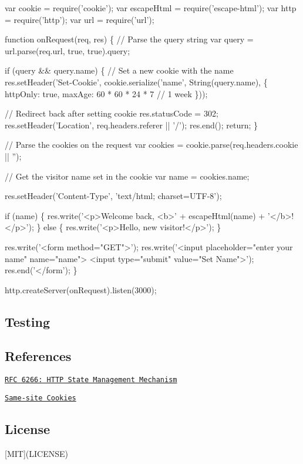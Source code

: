 \begin{DoxyCode}
var cookie = require('cookie');
var escapeHtml = require('escape-html');
var http = require('http');
var url = require('url');

function onRequest(req, res) \{
  // Parse the query string
  var query = url.parse(req.url, true, true).query;

  if (query && query.name) \{
    // Set a new cookie with the name
    res.setHeader('Set-Cookie', cookie.serialize('name', String(query.name), \{
      httpOnly: true,
      maxAge: 60 * 60 * 24 * 7 // 1 week
    \}));

    // Redirect back after setting cookie
    res.statusCode = 302;
    res.setHeader('Location', req.headers.referer || '/');
    res.end();
    return;
  \}

  // Parse the cookies on the request
  var cookies = cookie.parse(req.headers.cookie || '');

  // Get the visitor name set in the cookie
  var name = cookies.name;

  res.setHeader('Content-Type', 'text/html; charset=UTF-8');

  if (name) \{
    res.write('<p>Welcome back, <b>' + escapeHtml(name) + '</b>!</p>');
  \} else \{
    res.write('<p>Hello, new visitor!</p>');
  \}

  res.write('<form method="GET">');
  res.write('<input placeholder="enter your name" name="name"> <input type="submit" value="Set Name">');
  res.end('</form');
\}

http.createServer(onRequest).listen(3000);
\end{DoxyCode}


\subsection*{Testing}




\subsection*{References}


\begin{DoxyItemize}
\item \href{https://tools.ietf.org/html/rfc6266}{\tt R\+FC 6266\+: H\+T\+TP State Management Mechanism}
\item \href{https://tools.ietf.org/html/draft-west-first-party-cookies-07}{\tt Same-\/site Cookies}
\end{DoxyItemize}

\subsection*{License}

\mbox{[}M\+IT\mbox{]}(L\+I\+C\+E\+N\+SE) 